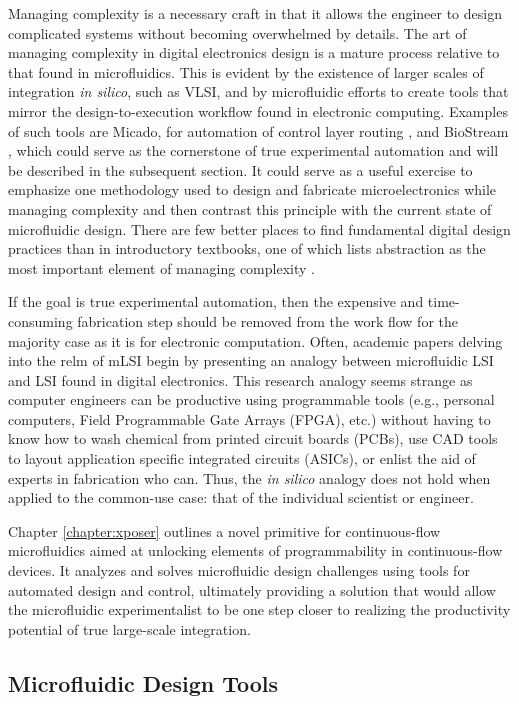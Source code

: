 Managing complexity is a necessary craft in that it allows the engineer to design complicated systems without becoming overwhelmed by details. The art of managing complexity in digital electronics design is  a mature process relative to that found in microfluidics. This is evident by the existence of larger scales of integration \emph{in silico}, such as VLSI, and by microfluidic efforts to create tools that mirror the design-to-execution workflow found in electronic computing. Examples of such tools are Micado, for automation of control layer routing \cite{amin2009}, and BioStream \cite{thies2008}, which could serve as the cornerstone of true experimental automation and will be described in the subsequent section. It could serve as a useful exercise to emphasize one methodology used to design and fabricate microelectronics while managing complexity and then contrast this principle with the current state of microfluidic design. There are few better places to find fundamental digital design practices than in introductory textbooks, one of which lists abstraction as the most important element of managing complexity \cite{Harris+Harris}.

If the goal is true experimental automation, then the expensive and time-consuming fabrication step should be removed from the work flow for the majority case as it is for electronic computation. Often, academic papers delving into the relm of mLSI begin by presenting an analogy between microfluidic LSI and LSI found in digital electronics. This research analogy seems strange as computer engineers can be productive using programmable tools (e.g., personal computers, Field Programmable Gate Arrays (FPGA), etc.) without having to know how to wash chemical from printed circuit boards (PCBs), use CAD tools to layout application specific integrated circuits (ASICs), or enlist the aid of experts in fabrication who can. Thus, the \emph{in silico} analogy does not hold when applied to the common-use case: that of the individual scientist or engineer.

Chapter \ref{chapter:xposer} outlines a novel primitive for continuous-flow microfluidics aimed at unlocking elements of programmability in continuous-flow devices. It analyzes and solves microfluidic design challenges using tools for automated design and control, ultimately providing a solution that would allow the microfluidic experimentalist to be one step closer to realizing the productivity potential of true large-scale integration. 

\subsection{Microfluidic Design Tools}
\label{ssec:DesignTools}

